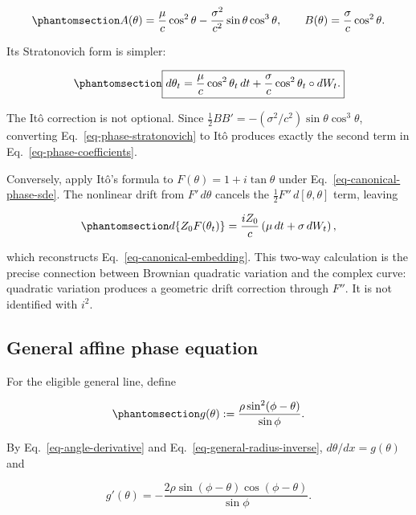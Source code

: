 \documentclass[
  english,
  10pt,
  letterpaper,
  DIV=11,
  numbers=noendperiod]{scrartcl}
\theoremstyle{definition}
\theoremstyle{plain}
\theoremstyle{plain}
\theoremstyle{remark}
\begin{document}
\begin{equation}\protect\phantomsection\label{eq-phase-coefficients}{
A(\theta)
=
\frac{\mu}{c}\cos^2\theta
-
\frac{\sigma^2}{c^2}\sin\theta\cos^3\theta,
\qquad
B(\theta)=\frac{\sigma}{c}\cos^2\theta.
}\end{equation}

Its Stratonovich form is simpler:

\begin{equation}\protect\phantomsection\label{eq-phase-stratonovich}{
\boxed{
d\theta_t
=
\frac{\mu}{c}\cos^2\theta_t\,dt
+
\frac{\sigma}{c}\cos^2\theta_t\circ dW_t.
}
}\end{equation}

The Itô correction is not optional. Since
\(\frac12BB'=-(\sigma^2/c^2)\sin\theta\cos^3\theta\), converting
Eq.~\ref{eq-phase-stratonovich} to Itô produces exactly the second term
in Eq.~\ref{eq-phase-coefficients}.

Conversely, apply Itô's formula to \(F(\theta)=1+i\tan\theta\) under
Eq.~\ref{eq-canonical-phase-sde}. The nonlinear drift from
\(F'\,d\theta\) cancels the \(\frac12F''\,d[\theta,\theta]\) term,
leaving

\begin{equation}\protect\phantomsection\label{eq-two-way-ito}{
d\{Z_0F(\theta_t)\}
=\frac{iZ_0}{c}\left(\mu\,dt+\sigma\,dW_t\right),
}\end{equation}

which reconstructs Eq.~\ref{eq-canonical-embedding}. This two-way
calculation is the precise connection between Brownian quadratic
variation and the complex curve: quadratic variation produces a
geometric drift correction through \(F''\). It is not identified with
\(i^2\).

\subsection{General affine phase
equation}\label{general-affine-phase-equation}

For the eligible general line, define

\begin{equation}\protect\phantomsection\label{eq-general-g}{
g(\theta)
:=
\frac{\rho\sin^2(\phi-\theta)}{\sin\phi}.
}\end{equation}

By Eq.~\ref{eq-angle-derivative} and
Eq.~\ref{eq-general-radius-inverse}, \(d\theta/dx=g(\theta)\) and

\[
g'(\theta)
=
-\frac{2\rho\sin(\phi-\theta)\cos(\phi-\theta)}
{\sin\phi}.
\]
\end{document}
